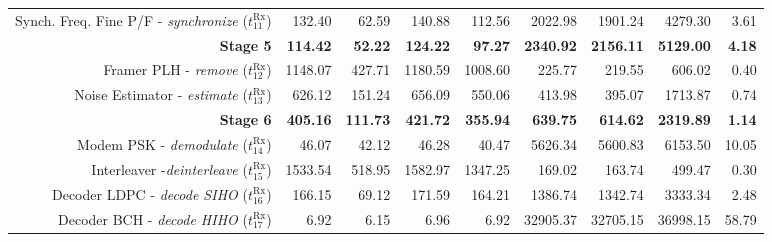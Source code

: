 \begin{table}[htp]
{{\begin{tabular}{r r r r r r r r r}
                          Synch. Freq. Fine P/F - \emph{synchronize} ($t^\text{Rx}_{11}$) &          132.40  &          62.59  &          140.88  &                   112.56 &          2022.98  &          1901.24  &          4279.30  &          3.61  \\
                                                                         \textbf{Stage 5} &  \textbf{114.42} &  \textbf{52.22} &  \textbf{124.22} &           \textbf{97.27} &  \textbf{2340.92} &  \textbf{2156.11} &  \textbf{5129.00} &  \textbf{4.18} \\ %
  \addlinespace
                                     Framer PLH -      \emph{remove} ($t^\text{Rx}_{12}$) &         1148.07  &         427.71  &         1180.59  &                 1008.60  &           225.77  &           219.55  &           606.02  &          0.40  \\
                                Noise Estimator -    \emph{estimate} ($t^\text{Rx}_{13}$) &          626.12  &         151.24  &          656.09  &                  550.06  &           413.98  &           395.07  &          1713.87  &          0.74  \\
                                                                         \textbf{Stage 6} &  \textbf{405.16} & \textbf{111.73} &  \textbf{421.72} &          \textbf{355.94} &   \textbf{639.75} &   \textbf{614.62} &  \textbf{2319.89} &  \textbf{1.14} \\ %
  \addlinespace
                                      Modem PSK -  \emph{demodulate} ($t^\text{Rx}_{14}$) &           46.07  &          42.12  &           46.28  &                   40.47  &          5626.34  &          5600.83  &          6153.50  &         10.05  \\
                                    Interleaver -\emph{deinterleave} ($t^\text{Rx}_{15}$) &         1533.54  &         518.95  &         1582.97  &                 1347.25  &           169.02  &           163.74  &           499.47  &          0.30  \\
                                   Decoder LDPC - \emph{decode SIHO} ($t^\text{Rx}_{16}$) &          166.15  &          69.12  &          171.59  &                  164.21  &          1386.74  &          1342.74  &          3333.34  &          2.48  \\
                                    Decoder BCH - \emph{decode HIHO} ($t^\text{Rx}_{17}$) &            6.92  &           6.15  &            6.96  &                    6.92  &         32905.37  &         32705.15  &         36998.15  &         58.79  \\

\end{tabular}}}
\end{table}
